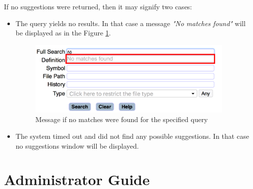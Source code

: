 If no suggestions were returned, then
it may signify two cases:
\begin{itemize}
    \item The query yields no results. In that case a message \textit{"No matches found"} will be displayed as in the
    Figure \ref{no_matches}.
    \begin{figure}[htbp]
        \centering
        \includegraphics[width=100mm]{../img/no_matches.png}
        \caption{Message if no matches were found for the specified query}
        \label{no_matches}
    \end{figure}

    \item The system timed out and did not find any possible suggestions. In that case no suggestions window will be displayed.
\end{itemize}

\section{Administrator Guide}
\label{administrator_guide}


